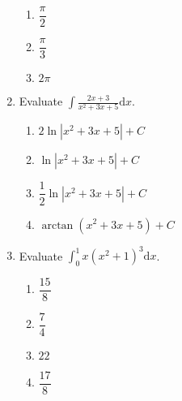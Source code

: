 \begin{multicols}{2}
\begin{enumerate}[label={\arabic*.}]
\begin{enumerate}[label={\Alph*.}]
        \item \(\dfrac{\pi}{2}\)
        \item \(\dfrac{\pi}{3}\)
        \item \(2\pi\)
      \end{enumerate}
    \item Evaluate \(\displaystyle \int \frac{2x+3}{x^2+3x+5} \mathrm{d}x\).
      \begin{enumerate}[label={\Alph*.}]
        \item \(2\ln|x^2+3x+5| + C\)
        \item \(\ln|x^2+3x+5| + C\)
        \item \(\dfrac{1}{2}\ln|x^2+3x+5| + C\)
        \item \(\arctan(x^2+3x+5) + C\)
      \end{enumerate}
    \item Evaluate \(\displaystyle \int_{0}^{1} {x(x^2+1)}^3 \mathrm{d}x\).
      \begin{enumerate}[label={\Alph*.}]
        \item \(\dfrac{15}{8}\)
        \item \(\dfrac{7}{4}\)
        \item \(22\)
		\item \(\dfrac{17}{8}\)
      \end{enumerate}
  \end{enumerate}
\end{multicols}
